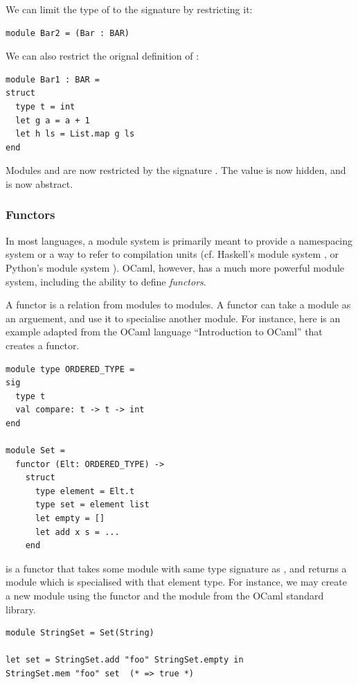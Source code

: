 We can limit the type of  to the signature
 by restricting it:

\begin{lstlisting}
module Bar2 = (Bar : BAR)
\end{lstlisting}

We can also restrict the orignal definition of :

\begin{lstlisting}
module Bar1 : BAR =
struct
  type t = int
  let g a = a + 1
  let h ls = List.map g ls
end
\end{lstlisting}

Modules  and  are now restricted by the
signature . The value  is now hidden, and
 is now abstract.

\subsubsection{Functors}

In most languages, a module system is primarily meant to provide a
namespacing system or a way to refer to compilation units
(cf. Haskell's module system \cite{www:haskell:modules}, or Python's
module system \cite{www:python:modules}). OCaml, however, has a much
more powerful module system, including the ability to define
\textit{functors}.

A functor is a relation from modules to modules. A functor can take a
module as an arguement, and use it to specialise another module. For
instance, here is an example adapted from the OCaml language
``Introduction to OCaml'' \cite{ocaml:spec} that creates a 
functor.

\begin{lstlisting}
module type ORDERED_TYPE =
sig
  type t
  val compare: t -> t -> int
end

module Set =
  functor (Elt: ORDERED_TYPE) ->
    struct
      type element = Elt.t
      type set = element list
      let empty = []
      let add x s = ...
    end
\end{lstlisting}

 is a functor that takes some module with same type
signature as , and returns a module which is
specialised with that element type. For instance, we may create a new
 module using the  functor and the
 module from the OCaml standard library.

\begin{lstlisting}
module StringSet = Set(String)

let set = StringSet.add "foo" StringSet.empty in
StringSet.mem "foo" set  (* => true *)
\end{lstlisting}

